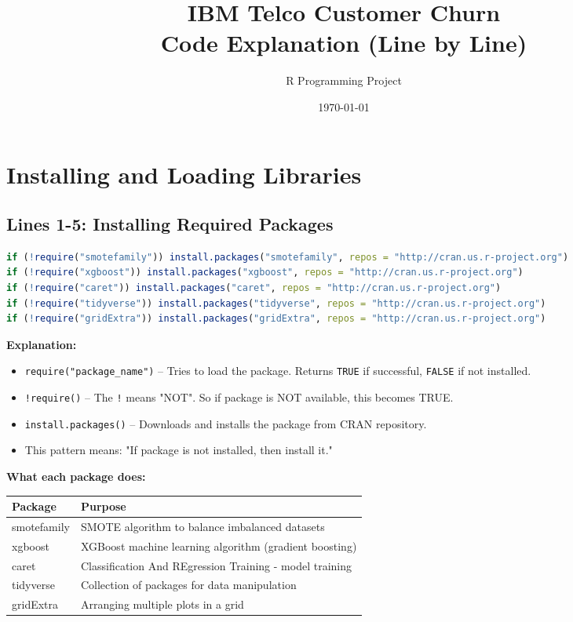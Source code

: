 \documentclass[12pt,a4paper]{article}
\title{\textbf{IBM Telco Customer Churn} \\ \Large Code Explanation (Line by Line)}
\author{R Programming Project}
\date{\today}
\begin{document}
\maketitle
\tableofcontents
\newpage

\section{Installing and Loading Libraries}

\subsection{Lines 1-5: Installing Required Packages}

\begin{lstlisting}[language=R]
if (!require("smotefamily")) install.packages("smotefamily", repos = "http://cran.us.r-project.org")
if (!require("xgboost")) install.packages("xgboost", repos = "http://cran.us.r-project.org")
if (!require("caret")) install.packages("caret", repos = "http://cran.us.r-project.org")
if (!require("tidyverse")) install.packages("tidyverse", repos = "http://cran.us.r-project.org")
if (!require("gridExtra")) install.packages("gridExtra", repos = "http://cran.us.r-project.org")
\end{lstlisting}

\textbf{Explanation:}
\begin{itemize}
    \item \texttt{require("package\_name")} -- Tries to load the package. Returns \texttt{TRUE} if successful, \texttt{FALSE} if not installed.
    \item \texttt{!require()} -- The \texttt{!} means "NOT". So if package is NOT available, this becomes TRUE.
    \item \texttt{install.packages()} -- Downloads and installs the package from CRAN repository.
    \item This pattern means: "If package is not installed, then install it."
\end{itemize}

\textbf{What each package does:}

\begin{table}[h]
\centering
\begin{tabular}{@{}ll@{}}
\toprule
\textbf{Package} & \textbf{Purpose} \\ \midrule
smotefamily & SMOTE algorithm to balance imbalanced datasets \\
xgboost & XGBoost machine learning algorithm (gradient boosting) \\
caret & Classification And REgression Training - model training \\
tidyverse & Collection of packages for data manipulation \\
gridExtra & Arranging multiple plots in a grid \\ \bottomrule
\end{tabular}
\end{table}
\end{document}
